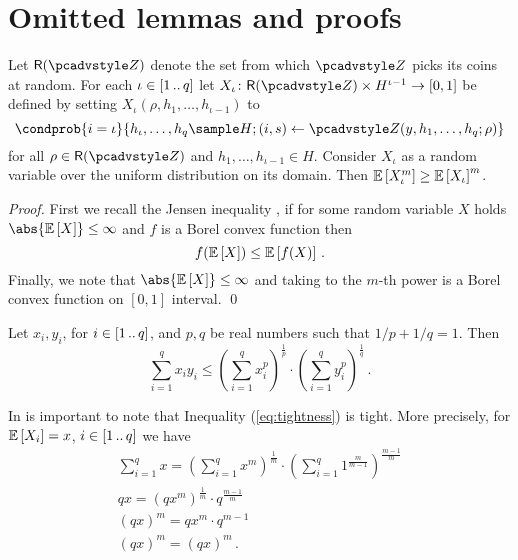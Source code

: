 \documentclass[runningheads,10pt]{llncs}
\begin{document}
\section{Omitted lemmas and proofs}
\begin{lemma}\label{lem:jensen}
	Let $\RND{\zdv}$ denote the set from which $\zdv$ picks its coins at random.
	For each $\iota \in [1 \, .. \, q]$ let $X_\iota \colon \RND{\zdv} \times
	H^{\iota - 1} \to [0, 1]$ be defined by setting $X_\iota(\rho, h_1, \ldots,
h_{\iota - 1})$ to 
\[
  \condprob{i = \iota}{h_\iota, \ldots, h_q \sample H; (i, s) \gets \zdv(y, h_1,
    \ldots, h_q; \rho)}
	\] 
	for all $\rho \in \RND{\zdv}$ and $h_1, \ldots, h_{\iota - 1} \in H$. Consider
  $X_\iota$ as a random variable over the uniform distribution on its domain.
  Then $\mathbb{E}\left[X_\iota^m\right] \geq \mathbb{E}\left[X_\iota\right]^m$.
\end{lemma}
\begin{proof}
	First we recall the Jensen inequality \cite{W:Weissten20}, if for some random
  variable $X$ holds $\abs{\expected{X}} \leq \infty$ and $f$ is a Borel convex
  function then
	\[
		f(\mathbb{E}\left[X\right]) \leq \mathbb{E}\left[f(X)\right]\,.
	\] 
	Finally, we note that $\abs{\expected{X}} \leq \infty$ and taking to the
  $m$-th power is a Borel convex function on $[0, 1]$ interval. \qed
\end{proof}

\begin{lemma}\label{lem:holder}
	Let $x_i, y_i$, for $i \in [1 \, .. \, q]$, and $p, q$ be real numbers such that
  $1/p + 1/q = 1$. Then
	\[
		\sum_{i = 1}^{q} x_i y_i \leq \left(\sum_{i = 1}^{q}
      x_i^p\right)^{\frac{1}{p}} \cdot \left(\sum_{i = 1}^{q}
      y_i^p\right)^{\frac{1}{q}}\,.
	\]
\end{lemma}

\begin{remark}
	In is important to note that Inequality (\ref{eq:tightness}) is tight. More
  precisely, for $\mathbb{E}\left[X_i\right] = x$, $i \in [1 \, .. \, q]$ we have
	\begin{gather*}
		\sum_{i = 1}^q x = \left(\sum_{i = 1}^{q} x^m\right)^\frac{1}{m} \cdot \left(\sum_{i = 1}^{q} 1^{\frac{m}{m - 1}}\right)^{\frac{m - 1}{m}} \\
		qx = \left(qx^m\right)^\frac{1}{m} \cdot q^{\frac{m - 1}{m}} \\
		(qx)^m = qx^m \cdot q^{m - 1} \\
		(qx)^m = (qx)^m\,.
	\end{gather*}
\end{remark}
\end{document}
